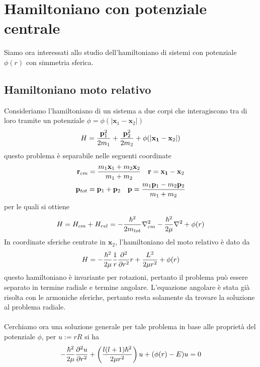 \documentclass{article}
\begin{document}
\newpage
\section{Hamiltoniano con potenziale centrale}
Siamo ora interessati allo studio dell'hamiltoniano di sistemi con potenziale $\phi(r)$ con simmetria sferica.

\subsection{Hamiltoniano moto relativo}
Consideriamo l'hamiltoniano di un sistema a due corpi che interagiscono tra di loro tramite un potenziale $\phi = \phi(|\mathbf{x}_1 - \mathbf{x}_2|)$
\begin{gather}
    H = \frac{\mathbf{p}_1^2}{2m_1} + \frac{\mathbf{p}_2^2}{2m_2} + \phi(|\mathbf{x_1} - \mathbf{x}_2|) \notag
\end{gather}
questo problema è separabile nelle seguenti coordinate
\begin{gather}
    \mathbf{r}_{cm} = \frac{m_1\mathbf{x}_1 + m_2\mathbf{x}_2}{m_1 + m_2} \quad \mathbf{r} = \mathbf{x_1} - \mathbf{x}_2 \notag \\
    \mathbf{p}_{tot} = \mathbf{p}_1 + \mathbf{p}_2 \quad \mathbf{p} = \frac{m_1\mathbf{p}_1 - m_2\mathbf{p}_2}{m_1 + m_2} \notag
\end{gather}
per le quali si ottiene
\begin{gather}
    H = H_{cm} + H_{rel} = -\frac{\hbar^2}{2m_{tot}}\nabla^2_{cm} - \frac{\hbar^2}{2\mu}\nabla^2 + \phi(r) \notag
\end{gather}
In coordinate sferiche centrate in $\mathbf{x}_2$, l'hamiltoniano del moto relativo è dato da
\begin{gather}
    H = -\frac{\hbar^2}{2\mu}\frac{1}{r}\frac{\partial^2}{\partial r^2}r + \frac{L^2}{2\mu r^2} + \phi(r) \notag
\end{gather}
questo hamiltoniano è invariante per rotazioni, pertanto il problema può essere separato in termine radiale e termine angolare. L'equazione angolare è stata già risolta con le armoniche sferiche, pertanto resta solamente da trovare la soluzione al problema radiale. \\ \\
Cerchiamo ora una soluzione generale per tale problema in base alle proprietà del potenziale $\phi$, per $u := rR$ si ha
\begin{gather}
    -\frac{\hbar^2}{2\mu}\frac{\partial^2 u}{\partial r^2} + \left( \frac{l(l+1)\hbar^2}{2\mu r^2} \right)u + (\phi(r) - E)u = 0 \notag
\end{gather}
\end{document}
